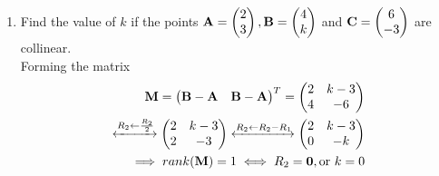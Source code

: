 \documentclass[journal,12pt,twocolumn]{IEEEtran}
\renewcommand\thesection{\arabic{section}}
\begin{document}
\begin{enumerate}[label=\thesection.\arabic*.,ref=\thesection.\theenumi]
\item Find the value of $k$ if the points $\mathbf{A}=\begin{pmatrix}2\\3\end{pmatrix}, \mathbf{B}=\begin{pmatrix}4\\k\end{pmatrix}$ and $\mathbf{C}=\begin{pmatrix}6\\-3\end{pmatrix}$ are collinear.
\\
\solution Forming the matrix 
\begin{align}
\mathbf{M} = \begin{pmatrix}\mathbf{B}-\mathbf{A} & \mathbf{B}-\mathbf{A}\end{pmatrix}^T 
= \begin{pmatrix}2 & k-3\\4 & -6\end{pmatrix}&
\\
\xleftrightarrow {R_2\leftarrow \frac{R_2}{2}}\begin{pmatrix}2 & k-3\\2 & -3\end{pmatrix}
\xleftrightarrow {R_2\leftarrow R_2-R_1}\begin{pmatrix}2 & k-3\\0 & -k\end{pmatrix}&
\\
\implies rank(\mathbf{M})= 1 \iff R_2 = \mathbf{0}, \text{or }k = 0 &
\end{align}


\end{enumerate}
\end{document}
